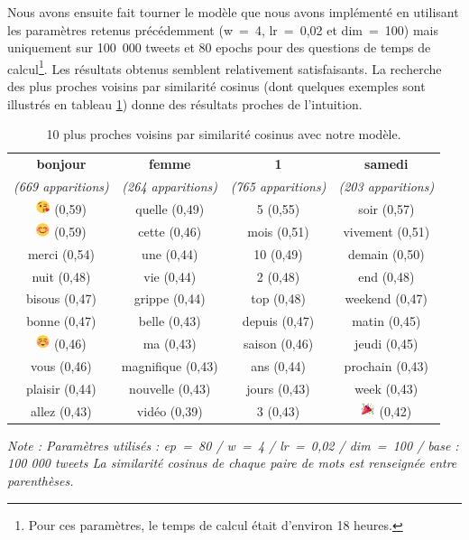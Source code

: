\documentclass[11pt,french,french]{article}
\let\rmarkdownfootnote\footnote%
\def\footnote{\protect\rmarkdownfootnote}
\begin{document}
Nous avons ensuite fait tourner le modèle que nous avons implémenté en
utilisant les paramètres retenus précédemment (w~=~4, lr~=~0,02 et
dim~=~100) mais uniquement sur 100~000 tweets et 80 epochs pour des
questions de temps de calcul\footnote{Pour ces paramètres, le temps de
  calcul était d'environ 18 heures.}. Les résultats obtenus semblent
relativement satisfaisants. La recherche des plus proches voisins par
similarité cosinus (dont quelques exemples sont illustrés en tableau
\ref{table:knn_ark}) donne des résultats proches de l'intuition.

\begin{table}[!h]
\begin{center}
\begin{tabular}{|c|c|c|c|}
    \hline
\textbf{bonjour} & \textbf{femme} & \textbf{1} & \textbf{samedi} \tabularnewline
\emph{(669 apparitions)} & \emph{(264 apparitions)} & \emph{(765 apparitions)} & \emph{(203 apparitions)} \tabularnewline
       \hline
\includegraphics[height=4mm]{img/emojis/1.png} (0,59) & quelle (0,49) & 5 (0,55) & soir (0,57) \tabularnewline
\includegraphics[height=4mm]{img/emojis/2.png} (0,59) & cette (0,46) & mois (0,51) & vivement (0,51) \tabularnewline
merci (0,54) & une (0,44) & 10 (0,49) & demain (0,50) \tabularnewline
nuit (0,48) & vie (0,44) & 2 (0,48) & end (0,48) \tabularnewline
bisous (0,47) & grippe (0,44) & top (0,48) & weekend (0,47) \tabularnewline
bonne (0,47) & belle (0,43) & depuis (0,47) & matin (0,45) \tabularnewline
\includegraphics[height=4mm]{img/emojis/3.png} (0,46) & ma (0,43) & saison (0,46) & jeudi (0,45) \tabularnewline
vous (0,46) & magnifique (0,43) & ans (0,44) & prochain (0,43) \tabularnewline
plaisir (0,44) & nouvelle (0,43) & jours (0,43) & week (0,43) \tabularnewline
allez (0,43) & vidéo (0,39) & 3 (0,43) & \includegraphics[height=4mm]{img/emojis/4.png} (0,42) \tabularnewline
    \hline
 \end{tabular}
\captionsetup{margin=0cm,format=hang,justification=justified}
\caption{10 plus proches voisins par similarité cosinus avec \og notre \fg{} modèle.}\label{table:knn_ark}
\end{center}
\vspace{-0.3cm}
\footnotesize
\emph{Note : Paramètres utilisés : ep = 80 / w = 4 / lr = 0,02 / dim = 100 / base : 100 000 tweets\newline
La similarité cosinus de chaque paire de mots est renseignée entre parenthèses.}

\end{table}
\end{document}
